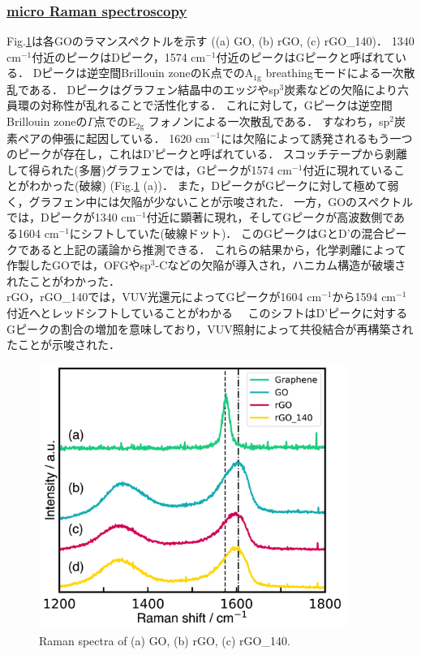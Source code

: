 \documentclass[platex,dvipdfmx]{jlreq}			%
\begin{document}
\subsubsection*{\ul{micro Raman spectroscopy}}
Fig.\ref{fig:Raman}は各GOのラマンスペクトルを示す ((a) GO, (b) rGO, (c) rGO\_140)．
1340 cm$^{-1}$付近のピークはDピーク，1574 cm$^{-1}$付近のピークはGピークと呼ばれている．
Dピークは逆空間Brillouin zoneのK点でのA$_{\mathrm{1g}}$ breathingモードによる一次散乱である\supercite{ferrari_raman_2013}．
Dピークはグラフェン結晶中のエッジやsp$^3$炭素などの欠陥により六員環の対称性が乱れることで活性化する．
これに対して，Gピークは逆空間Brillouin zoneの$\Gamma$点でのE$_{\mathrm{2g}}$ フォノンによる一次散乱である．
すなわち，sp$^2$炭素ペアの伸張に起因している．
1620 cm$^{-1}$には欠陥によって誘発されるもう一つのピークが存在し，これはD'ピークと呼ばれている．
スコッチテープから剥離して得られた(多層)グラフェンでは，Gピークが1574 cm$^{-1}$付近に現れていることがわかった(破線) (Fig.\ref{fig:Raman} (a))．
また，DピークがGピークに対して極めて弱く，グラフェン中には欠陥が少ないことが示唆された．
一方，GOのスペクトルでは，Dピークが1340 cm$^{-1}$付近に顕著に現れ，そしてGピークが高波数側である1604 cm$^{-1}$にシフトしていた(破線ドット)．
このGピークはGとD'の混合ピークであると上記の議論から推測できる．
これらの結果から，化学剥離によって作製したGO\supercite{hirata_thin-film_2004}では，OFGやsp$^3$-Cなどの欠陥が導入され，ハニカム構造が破壊されたことがわかった．\\
\indent
rGO，rGO\_140では，VUV光還元によってGピークが1604 cm$^{-1}$から1594 cm$^{-1}$付近へとレッドシフトしていることがわかる　
このシフトはD'ピークに対するGピークの割合の増加を意味しており，VUV照射によって共役結合が再構築されたことが示唆された．

\begin{figure}[H]
    \centering
    \includegraphics[width=100mm]{figures/figure4.png}
    \caption{Raman spectra of (a) GO, (b) rGO, (c) rGO\_140.}
    \label{fig:Raman}
\end{figure}
\end{document}
